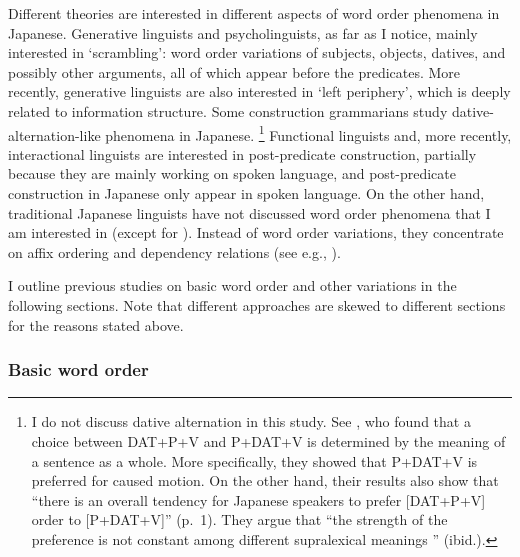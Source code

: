 Different theories are interested in different aspects of word order phenomena in Japanese.
Generative linguists and psycholinguists, as far as I notice, mainly interested in `scrambling':
word order variations of subjects, objects, datives, and possibly other arguments,
all of which appear before the predicates.
More recently, generative linguists are also interested in `left periphery',
which is deeply related to information structure.
Some construction grammarians study dative-alternation-like phenomena in Japanese.%
 \footnote{
 I do not discuss dative alternation in this study.
 See ,
 who found that a choice between DAT+P+V and P+DAT+V is determined
 by the meaning of a sentence as a whole.
 More specifically, they showed that P+DAT+V is preferred for caused motion.
 On the other hand, their results also show that
 ``there is an overall tendency for Japanese speakers to prefer [DAT+P+V] order to [P+DAT+V]'' (p.~1).
 They argue that ``the strength of the preference is not constant among different supralexical meanings '' (ibid.).
 }
Functional linguists and, more recently, interactional linguists are interested in post-predicate construction,
partially because they are mainly working on spoken language,
and post-predicate construction in Japanese only appear in spoken language.
On the other hand,
traditional Japanese linguists have not discussed word order phenomena
that I am interested in (except for ).
Instead of word order variations, they concentrate on affix ordering and dependency relations (see e.g., ).

I outline previous studies on basic word order and other variations in the following sections.
Note that different approaches are skewed to different sections
for the reasons stated above.



\subsubsection{Basic word order}

